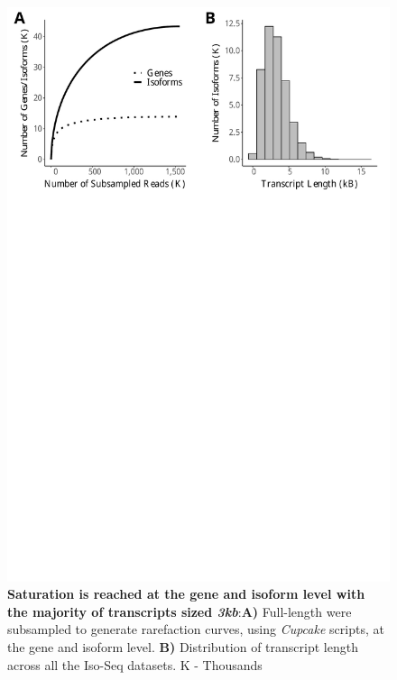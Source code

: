 \vspace{1cm}
\begin{figure}[!h]
	\begin{center}
		\includegraphics[page=1,trim={0 26cm 0 0},clip,scale = 0.55]{Figures/IsoSeqWholeTranscriptome.pdf}
	\end{center}
	\captionsetup{width=0.95\textwidth}
	\caption[Rarefaction Curves of global transcriptome profiling of the mouse cortex]%
	{\textbf{Saturation is reached at the gene and isoform level with the majority of transcripts sized \textit{3kb}}:\textbf{A)} Full-length were subsampled to generate rarefaction curves, using \textit{Cupcake} scripts, at the gene and isoform level. \textbf{B)} Distribution of transcript length across all the Iso-Seq datasets. K - Thousands}
	\label{fig:isoseq_whole_rarefaction}
\end{figure}

